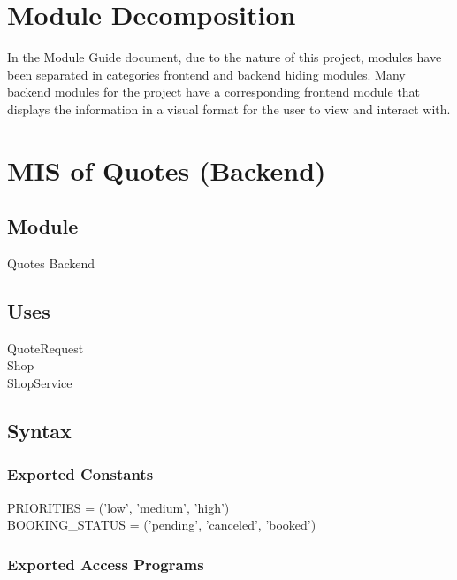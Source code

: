 \documentclass[12pt, titlepage]{article}
\begin{document}
\section{Module Decomposition}

In the Module Guide document, due to the nature of this project, modules have been separated in categories frontend and backend hiding modules. Many backend modules for the project have a corresponding frontend module that displays the information in a visual format for the user to view and interact with. 

\newpage

\section{MIS of Quotes (Backend)} \label{Module} 

\subsection{Module}

Quotes Backend

\subsection{Uses}

QuoteRequest \\ 
Shop \\
ShopService

\subsection{Syntax}

\subsubsection{Exported Constants}

PRIORITIES = ('low', 'medium', 'high') \\
BOOKING\_STATUS = ('pending', 'canceled', 'booked')

\subsubsection{Exported Access Programs}
\end{document}
